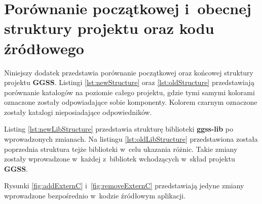 \section{Porównanie początkowej i~obecnej struktury projektu oraz kodu źródłowego}

Niniejszy dodatek przedstawia porównanie początkowej oraz końcowej struktury projektu \textbf{GGSS}. Listingi \ref{lst:newStructure} oraz \ref{lst:oldStructure} przedstawiają porównanie katalogów na poziomie całego projektu, gdzie tymi samymi kolorami oznaczone zostały odpowiadające sobie komponenty. Kolorem czarnym oznaczone zostały katalogi nieposiadające odpowiedników.

Listing \ref{lst:newLibStructure} przedstawia strukturę biblioteki \textbf{ggss-lib} po wprowadzonych zmianach. Na listingu \ref{lst:oldLibStructure} przedstawiona została poprzednia struktura tejże biblioteki w~celu ukazania różnic. Takie zmiany zostały wprowadzone w~każdej z~bibliotek wchodzących w~skład projektu \textbf{GGSS}.

Rysunki \ref{fig:addExternC} i~\ref{fig:removeExternC} przedstawiają jedyne zmiany wprowadzone bezpośrednio w~kodzie źródłowym aplikacji.

\newpage

\twocolumn


\def\redcolor{\color{red}}
\def\blackcolor{\color{black}}
\def\greencolor{\color{green}}
\def\purplecolor{\color{plum(traditional)}}
\def\bluecolor{\color{blue}}
\def\ambercolor{\color{amber(sae/ece)}}
\def\darkgreencolor{\color{cadmiumgreen}}
\def\capricolor{\color{capri}}
\def\magentacolor{\color{magenta}}
\def\sinopiacolor{\color{sinopia}}
\def\yellowcolor{\color{salmon}}
\def\fyellowcolor{\color{fyellow}}

